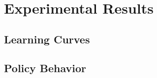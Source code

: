 \documentclass[a4paper,oneside]{book}
\theoremstyle{definition}
\begin{document}
\chapter{Experimental Results}

\section{Learning Curves}

\section{Policy Behavior}
\end{document}
